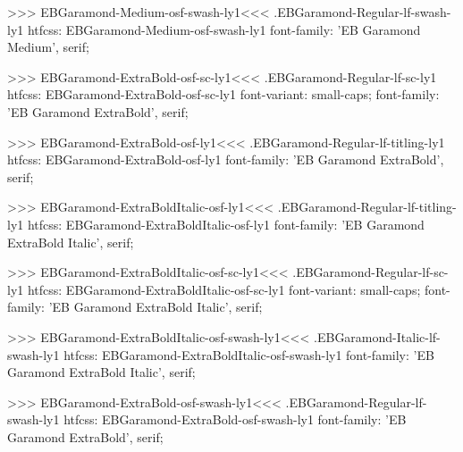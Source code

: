 {{>>>
\<EBGaramond-Medium-osf-swash-ly1\><<<
.EBGaramond-Regular-lf-swash-ly1
htfcss:  EBGaramond-Medium-osf-swash-ly1  font-family: 'EB Garamond Medium', serif;

>>>
\<EBGaramond-ExtraBold-osf-sc-ly1\><<<
.EBGaramond-Regular-lf-sc-ly1
htfcss:  EBGaramond-ExtraBold-osf-sc-ly1  font-variant: small-caps; font-family: 'EB Garamond ExtraBold', serif;

>>>
\<EBGaramond-ExtraBold-osf-ly1\><<<
.EBGaramond-Regular-lf-titling-ly1
htfcss:  EBGaramond-ExtraBold-osf-ly1  font-family: 'EB Garamond ExtraBold', serif;

>>>
\<EBGaramond-ExtraBoldItalic-osf-ly1\><<<
.EBGaramond-Regular-lf-titling-ly1
htfcss:  EBGaramond-ExtraBoldItalic-osf-ly1  font-family: 'EB Garamond ExtraBold Italic', serif;

>>>
\<EBGaramond-ExtraBoldItalic-osf-sc-ly1\><<<
.EBGaramond-Regular-lf-sc-ly1
htfcss:  EBGaramond-ExtraBoldItalic-osf-sc-ly1  font-variant: small-caps; font-family: 'EB Garamond ExtraBold Italic', serif;

>>>
\<EBGaramond-ExtraBoldItalic-osf-swash-ly1\><<<
.EBGaramond-Italic-lf-swash-ly1
htfcss:  EBGaramond-ExtraBoldItalic-osf-swash-ly1  font-family: 'EB Garamond ExtraBold Italic', serif;

>>>
\<EBGaramond-ExtraBold-osf-swash-ly1\><<<
.EBGaramond-Regular-lf-swash-ly1
htfcss:  EBGaramond-ExtraBold-osf-swash-ly1  font-family: 'EB Garamond ExtraBold', serif;

}}
